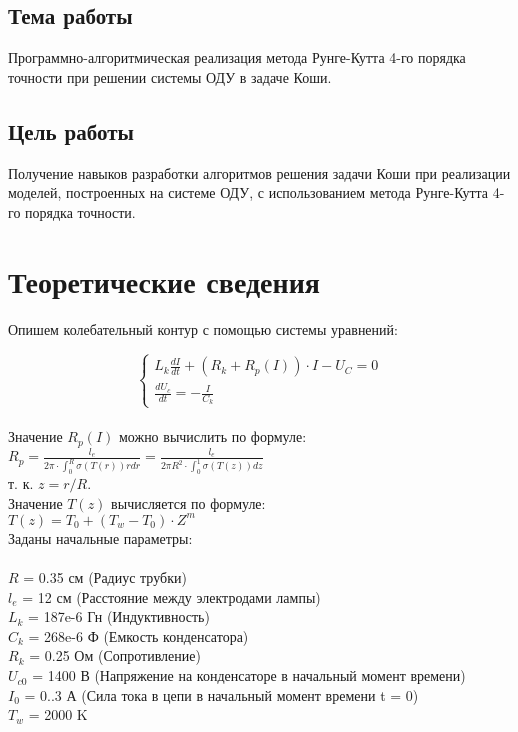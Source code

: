 \section*{Тема работы}

Программно-алгоритмическая реализация метода Рунге-Кутта 4-го порядка точности при решении системы ОДУ в задаче Коши.

\section*{Цель работы}
Получение навыков разработки алгоритмов решения задачи Коши при реализации моделей, построенных на системе ОДУ, с использованием метода Рунге-Кутта 4-го порядка точности.

\chapter{Теоретические сведения}

Опишем колебательный контур с помощью системы уравнений:

\begin{equation*}
    \begin{cases} L_k \frac{dI}{dt} + (R_k + R_p(I)) \cdot I - U_C = 0
        \\ \frac{dU_c}{dt} = - \frac{I}{C_k}
    \end{cases}
\end{equation*}\\

Значение $R_p(I)$ можно вычислить по формуле:\\

$R_p = \frac{l_e}{2 \pi \cdot \int_0^R \sigma(T(r))rdr} = \frac{l_e}{2 \pi R^2 \cdot \int_0^1 \sigma(T(z))dz}$\\

т. к. $z=r/R$. \\

\indent Значение $T(z)$ вычисляется по формуле:\\

$T(z) = T_0 + (T_w - T_0) \cdot Z^m$\\

Заданы начальные параметры:\\\\
\indent $R$ = 0.35 см (Радиус трубки)\\
\indent $l_{e}$ = 12 см (Расстояние между электродами лампы)\\
\indent $L_{k}$ = 187e-6 Гн (Индуктивность)\\
\indent $C_{k}$ = 268e-6 Ф (Емкость конденсатора)\\
\indent $R_{k}$ = 0.25 Ом (Сопротивление)\\
\indent $U_{c0}$ = 1400 В (Напряжение на конденсаторе в начальный момент времени)\\
\indent $I_{0}$ = 0..3 А (Сила тока в цепи в начальный момент времени t = 0)\\
\indent $T_{w}$ = 2000 K

